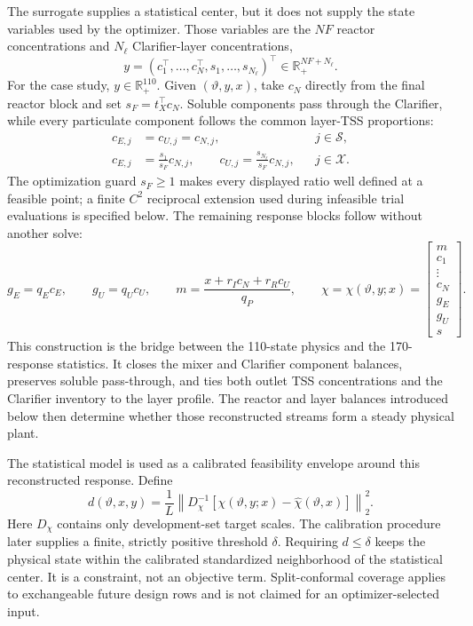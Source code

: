 \documentclass[a4paper,fleqn]{cas-sc}
\begin{document}
The surrogate supplies a statistical center, but it does not supply the state variables used by the optimizer. Those variables are the $NF$ reactor concentrations and $N_\ell$ Clarifier-layer concentrations,
\begin{equation}
\label{eq:mechanistic_state}
y=(c_1^\top,\ldots,c_N^\top,s_1,\ldots,s_{N_\ell})^\top
\in\mathbb R_+^{NF+N_\ell}.
\end{equation}
For the case study, $y\in\mathbb R_+^{110}$. Given $(\vartheta,y,x)$, take $c_N$ directly from the final reactor block and set $s_F=t_X^\top c_N$. Soluble components pass through the Clarifier, while every particulate component follows the common layer-TSS proportions:
\begin{equation}
\label{eq:combined_outlet_reconstruction}
\begin{aligned}
c_{E,j}&=c_{U,j}=c_{N,j}, &&j\in\mathcal S,\\
c_{E,j}&=\frac{s_1}{s_F}c_{N,j},\qquad
c_{U,j}=\frac{s_{N_\ell}}{s_F}c_{N,j}, &&j\in\mathcal X.
\end{aligned}
\end{equation}
The optimization guard $s_F\geq1$ makes every displayed ratio well defined at a feasible point; a finite $C^2$ reciprocal extension used during infeasible trial evaluations is specified below. The remaining response blocks follow without another solve:
\begin{equation}
\label{eq:combined_response_reconstruction}
g_E=q_Ec_E,\qquad g_U=q_Uc_U,\qquad
m=\frac{x+r_Ic_N+r_Rc_U}{q_P},\qquad
\chi=\chi(\vartheta,y;x)
=\begin{bmatrix}m\\c_1\\\vdots\\c_N\\g_E\\g_U\\s\end{bmatrix}.
\end{equation}
This construction is the bridge between the 110-state physics and the 170-response statistics. It closes the mixer and Clarifier component balances, preserves soluble pass-through, and ties both outlet TSS concentrations and the Clarifier inventory to the layer profile. The reactor and layer balances introduced below then determine whether those reconstructed streams form a steady physical plant.

The statistical model is used as a calibrated feasibility envelope around this reconstructed response. Define
\begin{equation}
\label{eq:surrogate_fidelity}
d(\vartheta,x,y)=\frac{1}{L}
\left\|D_\chi^{-1}\left[\chi(\vartheta,y;x)-\widehat\chi(\vartheta,x)\right]\right\|_2^2.
\end{equation}
Here $D_\chi$ contains only development-set target scales. The calibration procedure later supplies a finite, strictly positive threshold $\delta$. Requiring $d\leq\delta$ keeps the physical state within the calibrated standardized neighborhood of the statistical center. It is a constraint, not an objective term. Split-conformal coverage applies to exchangeable future design rows and is not claimed for an optimizer-selected input.
\end{document}
